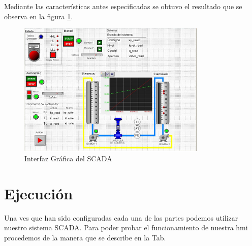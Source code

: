 Mediante las características antes especificadas se obtuvo el resultado que se 
observa en la figura \ref{fig:hmiscada}.
  \begin{figure}[!ht]
	\centering
	\includegraphics[width=0.8\textwidth]
	{Cap5-SCADA/images/hmiScada.jpeg}
	\caption{Interfaz Gráfica del SCADA}
	\label{fig:hmiscada}
  \end{figure}

\section{Ejecución}
\label{sec:Ejecucion}
Una ves que han sido configuradas cada una de las partes podemos utilizar 
nuestro sistema SCADA. Para poder probar el funcionamiento de nuestra \gls{hmi} 
procedemos de la manera que se describe en la Tab.